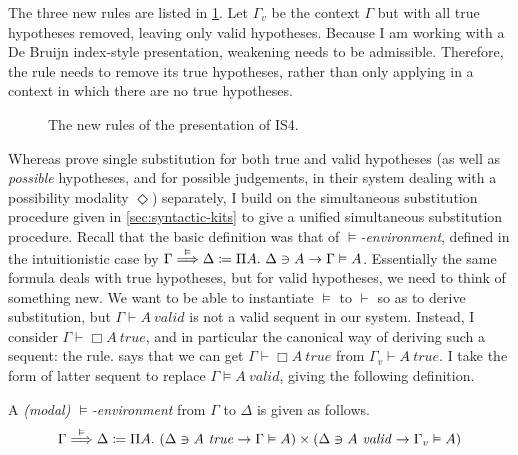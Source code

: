 The three new rules are listed in \cref{fig:PD}.
Let $\Gamma_v$ be the context $\Gamma$ but with all true hypotheses removed,
leaving only valid hypotheses.
Because I am working with a De Bruijn index-style presentation, weakening needs
to be admissible.
Therefore, the  rule needs to remove its true hypotheses,
rather than only applying in a context in which there are no true hypotheses.

\begin{figure}
  \caption{The new rules of the \citeauthor{judgmental} presentation of IS4.}
  \label{fig:PD}
\end{figure}

Whereas \citet{judgmental} prove single substitution for both true and valid
hypotheses (as well as \emph{possible} hypotheses, and for possible judgements,
in their system dealing with a possibility modality $\Diamond$) separately, I
build on the simultaneous substitution procedure given in
\cref{sec:syntactic-kits} to give a unified simultaneous substitution procedure.
Recall that the basic definition was that of \emph{$\vDash$-environment},
defined in the intuitionistic case by
$\Gamma \stackrel{\vDash}\Longrightarrow \Delta \coloneqq \Pi A.~\Delta \ni A \to \Gamma \vDash A$.
Essentially the same formula deals with true hypotheses, but for valid
hypotheses, we need to think of something new.
We want to be able to instantiate $\vDash$ to $\vdash$ so as to derive
substitution, but $\Gamma \vdash A~\mathit{valid}$ is not a valid sequent in our
system.
Instead, I consider $\Gamma \vdash \Box A~\mathit{true}$, and in particular the
canonical way of deriving such a sequent: the  rule.
 says that we can get
$\Gamma \vdash \Box A~\mathit{true}$ from $\Gamma_v \vdash A~\mathit{true}$.
I take the form of latter sequent to replace $\Gamma \vDash A~\mathit{valid}$,
giving the following definition.

\begin{definition}\label{def:PD-env}
  A \emph{(modal) $\vDash$-environment} from $\Gamma$ to $\Delta$ is given as
  follows.
  \[
    \Gamma \env\vDash \Delta \coloneqq
    \Pi A.~\plr{\Delta \ni A~\mathit{true} \to \Gamma \vDash A}
    \times \plr{\Delta \ni A~\mathit{valid} \to \Gamma_v \vDash A}
  \]
\end{definition}

